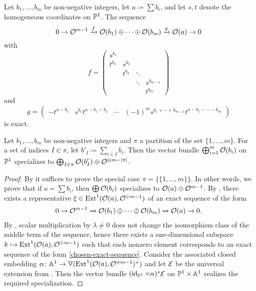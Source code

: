 \begin{remark} \label{rem:exact-sequence-exists}
	Let $b_1,\dotsc,b_m$ be non-negative integers, let $a\coloneqq \sum b_i$, and let $s,t$ denote the homogeneous coordinates on $\mathbb{P}^1$. The sequence
	\[ 0 \to \mathcal{O}^{m-1} \xrightarrow{f} \mathcal{O}(b_1)\oplus \dotsb \oplus \mathcal{O}(b_m) \xrightarrow{g} \mathcal{O}(a) \to 0 \]
	with \[
	f = \begin{pmatrix}
	s^{b_1}&        &	   &           \\
	t^{b_2}& s^{b_2}&      &           \\
	       & t^{b_3}&\ddots&           \\
	       &        &\ddots&s^{b_{m-1}}\\
	       &        &      &t^{b_m}
	\end{pmatrix} 
	\]
	and
	\[
	g = \begin{pmatrix}
	-t^{a-b_1} & s^{b_1}t^{a-b_1-b_2} & \cdots & (-1)^{m} s^{b_1 + \dotsb + b_{m-1}}t^{a-b_1-\dotsb-b_m}
	\end{pmatrix}
	\]
	is exact.
\end{remark}

\begin{proposition} \label{specialization-partitions}
	Let $b_1,\dotsc,b_m$ be non-negative integers and $\pi$ a partition of the set $\{1,\dotsc,m\}$. For a set of indices $I\in \pi$, let $b'_I \coloneqq \sum_{i \in I} b_i$. Then the vector bundle $\bigoplus_{i=1}^m \mathcal{O} (b_i)$ on $\mathbb{P}^1$ specializes to $\bigoplus_{I\in\pi} \mathcal{O}(b'_I) \oplus \mathcal{O}^{\oplus m-\lvert\pi\rvert}$.	
\end{proposition}

\begin{proof}
	By  it suffices to prove the special case $\pi = \{\{1,\dotsc,m\}\}$. In other words, we prove that if $a = \sum b_i$, then $\bigoplus\mathcal{O}(b_i)$ specializes to $\mathcal{O}(a)\oplus \mathcal{O}^{m-1}$. By , there exists a representative $\xi \in \operatorname{Ext}^1(\mathcal{O}(a),\mathcal{O}^{\oplus m-1})$ of an exact sequence of the form
	\begin{align} \label{chosen-exact-sequence}
		\sesarrows{\mc{O}^{m-1}}{}{\mc{O}(b_1)\oplus \dotsb \oplus \mc{O}(b_m)}{}{\mc{O}(a)}. %
	\end{align}
	By , scalar multiplication by $\lambda \neq 0$ does not change the isomorphism class of the middle term of the sequence, hence there exists a one-dimensional subspace $k \injectto \Ext^1(\mc{O}(a),\mc{O}^{\oplus m-1})$ such that each nonzero element corresponds to an exact sequence of the form
	\cref{chosen-exact-sequence}. Consider the associated closed embedding $\alpha \colon \mathbb{A}^1 \to \mathbb{V}(\operatorname{Ext}^1(\mathcal{O}(a),\mathcal{O}^{\oplus m-1})^\vee)$ and let $\mathcal{E}$ be the universal extension from . Then the vector bundle $(\operatorname{id}_{\mathbb{P}^1}\times\alpha)^{*}\mathcal{E}$ on $\mathbb{P}^1\times\mathbb{A}^1$ realizes the required specialization. 
\end{proof}

